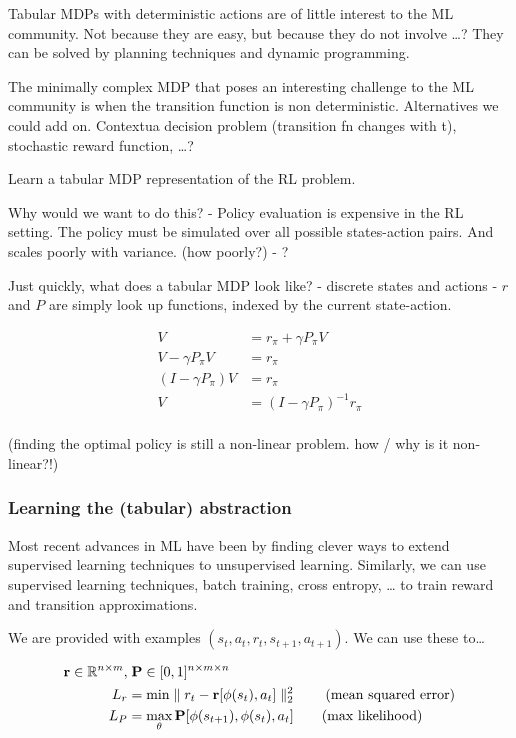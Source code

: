 Tabular MDPs with deterministic actions are of little interest to the ML
community. Not because they are easy, but because they do not involve
\ldots{}? They can be solved by planning techniques and dynamic
programming.

The minimally complex MDP that poses an interesting challenge to the ML
community is when the transition function is non deterministic.
Alternatives we could add on. Contextua decision problem (transition fn
changes with t), stochastic reward function, \ldots{}?

Learn a tabular MDP representation of the RL problem.

Why would we want to do this? - Policy evaluation is expensive in the RL
setting. The policy must be simulated over all possible states-action
pairs. And scales poorly with variance. (how poorly?) - ?

Just quickly, what does a tabular MDP look like? - discrete states and
actions - \(r\) and \(P\) are simply look up functions, indexed by the
current state-action.

\begin{align}
V &= r_{\pi} + \gamma P_{\pi} V \tag{bellman eqn}\\
V - \gamma P_{\pi} V &= r_{\pi}\\
(I-\gamma P_{\pi})V &= r_{\pi}\\
V &= (I-\gamma P_{\pi})^{-1}r_{\pi}\\
\end{align}

(finding the optimal policy is still a non-linear problem. how / why is
it non-linear?!)

\hypertarget{learning-the-tabular-abstraction}{%
\subsubsection{Learning the (tabular)
abstraction}\label{learning-the-tabular-abstraction}}

Most recent advances in ML have been by finding clever ways to extend
supervised learning techniques to unsupervised learning. Similarly, we
can use supervised learning techniques, batch training, cross entropy,
\ldots{} to train reward and transition approximations.

We are provided with examples \((s_t, a_t, r_t, s_{t+1}, a_{t+1})\). We
can use these to\ldots{}

\begin{align}
\textbf  r \in \mathbb R^{n \times m}, &\; \textbf P \in [0,1]^{n \times m \times n} \\
L_{r} &= \text{min} \parallel r_t - \textbf r[\phi(s_t), a_t] \parallel^2_2 \tag{mean squared error}\\
L_{P} &= \mathop{\text{max}}_{\theta} \textbf P[\phi(s_{t+1}),\phi(s_t), a_t]\tag{max likelihood}\\
\end{align}

